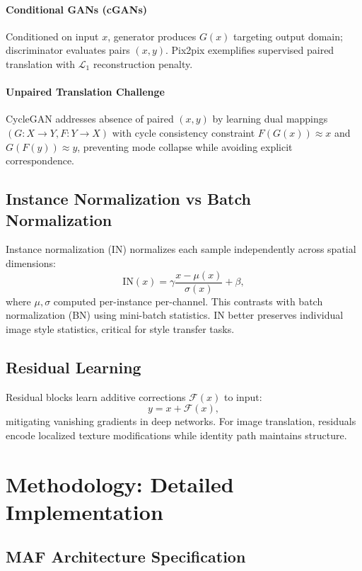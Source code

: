 \documentclass[11pt]{article}
\begin{document}
\paragraph{Conditional GANs (cGANs)} Conditioned on input $x$, generator produces $G(x)$ targeting output domain; discriminator evaluates pairs $(x, y)$. Pix2pix exemplifies supervised paired translation with $\mathcal{L}_1$ reconstruction penalty.

\paragraph{Unpaired Translation Challenge} CycleGAN addresses absence of paired $(x,y)$ by learning dual mappings $(G: X \to Y, F: Y \to X)$ with cycle consistency constraint $F(G(x)) \approx x$ and $G(F(y)) \approx y$, preventing mode collapse while avoiding explicit correspondence.

\subsection{Instance Normalization vs Batch Normalization}
Instance normalization (IN) normalizes each sample independently across spatial dimensions:
\begin{equation}
\text{IN}(x) = \gamma \frac{x - \mu(x)}{\sigma(x)} + \beta,
\end{equation}
where $\mu, \sigma$ computed per-instance per-channel. This contrasts with batch normalization (BN) using mini-batch statistics. IN better preserves individual image style statistics, critical for style transfer tasks.

\subsection{Residual Learning}
Residual blocks learn additive corrections $\mathcal{F}(x)$ to input:
\begin{equation}
y = x + \mathcal{F}(x),
\end{equation}
mitigating vanishing gradients in deep networks. For image translation, residuals encode localized texture modifications while identity path maintains structure.

\section{Methodology: Detailed Implementation}
\subsection{MAF Architecture Specification}
\end{document}
